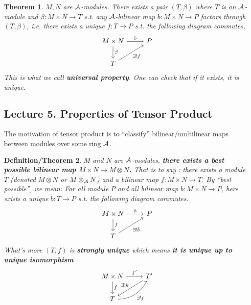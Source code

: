 \documentclass[11pt]{article}
\newtheorem{thm}{Theorem}[section]
\newtheorem{dfn/thm}[thm]{Definition/Theorem}
\newcommand{\cala}{{\cal A}}
\newcommand{\rta}{\rightarrow}
\newcommand{\lrta}{\longrightarrow}
\begin{document}
\begin{thm}
$M,N$ are $\cala$-modules. There exists a pair $(T,\beta)$ where $T$ is an $\cala$-module and $\beta:M\times N\lrta T$ s.t.  any $\cala$-bilinear map $b:M\times N\lrta P$ factors through $(T,\beta)$, i.e. there exists a unique $f:T\lrta P$ s.t. the following  diagram commutes.
\[
\begin{tikzcd}
 M\times N \arrow[d,"\beta"] \ar[r,"b"] & P \\
T\arrow[swap,ur,"\exists !f"] &    
\end{tikzcd}
\]
This is what we call \textbf{universal property}. One can check that if it exists, it is unique.
\end{thm}
\subsection{Lecture 5. Properties of Tensor Product}
The motivation of tensor product is  to ``classify'' bilinear/multilinear maps between modules over some ring $\cala$.
\begin{dfn/thm}
$M$ and $N$ are $\cala$-modules, \textbf{there exists a best possible bilinear map $M\times N\rta M\otimes N$.} That is to say : there exists a module $T$ (denoted $M\otimes N$ or $M\otimes_\cala N$) and a bilinear map $f:M\times N\lrta T$. By ``best possible'', we mean:
For all module $P$ and all bilinear map $b:M\times N\rta P$,
here exists a unique $\tilde{b}:T\lrta P$ s.t. the following  diagram commutes.
\[
\begin{tikzcd}
 M\times N \arrow[d,"f"] \ar[r,"b"] & P \\
T\arrow[swap,ur,"\exists !\tilde{b}"] &    
\end{tikzcd}
\] 
What's more $(T,f)$ is \textbf{strongly unique} which means \textbf{it is unique up to unique isomorphism}
\[
\begin{tikzcd}
 M\times N \arrow[d,"f"] \ar[r,"f'"] & T'\arrow[swap,dl,"\exists !k"] \\
T\arrow[swap,ur,bend right,"\exists !j"] &    
\end{tikzcd}
\] 
\end{dfn/thm}
\end{document}
